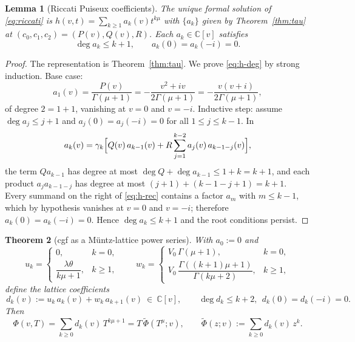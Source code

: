 \documentclass[11pt]{article}
\newtheorem{theorem}{Theorem}[section]
\newtheorem{lemma}[theorem]{Lemma}
\newcommand{\C}{\mathbb{C}}
\begin{document}
\begin{lemma}[Riccati Puiseux coefficients]\label{lem:h}
The unique formal solution of \eqref{eq:riccati} is
$h(v,t)=\sum_{k\ge1}a_k(v)t^{k\mu}$ with $\{a_k\}$ given by
Theorem~\ref{thm:tau} at $(c_0,c_1,c_2)=(P(v),Q(v),R)$. Each $a_k\in\C[v]$
satisfies
\begin{equation}\label{eq:h-deg}
\deg a_k\le k+1,\qquad a_k(0)=a_k(-i)=0 .
\end{equation}
\end{lemma}

\begin{proof}
The representation is Theorem~\ref{thm:tau}. We prove \eqref{eq:h-deg} by
strong induction. Base case:
\begin{equation}\label{eq:h-base}
a_1(v)=\frac{P(v)}{\Gamma(\mu+1)}=-\frac{v^2+iv}{2\Gamma(\mu+1)}
=-\frac{v(v+i)}{2\Gamma(\mu+1)},
\end{equation}
of degree $2=1+1$, vanishing at $v=0$ and $v=-i$. Inductive step: assume
$\deg a_j\le j+1$ and $a_j(0)=a_j(-i)=0$ for all $1\le j\le k-1$. In
\begin{equation}\label{eq:h-rec}
a_k(v)=\gamma_k\Bigl[Q(v)\,a_{k-1}(v)
+R\sum_{j=1}^{k-2}a_j(v)\,a_{k-1-j}(v)\Bigr],
\end{equation}
the term $Q a_{k-1}$ has degree at most $\deg Q+\deg a_{k-1}\le 1+k=k+1$,
and each product $a_j a_{k-1-j}$ has degree at most
$(j+1)+(k-1-j+1)=k+1$. Every summand on the right of \eqref{eq:h-rec}
contains a factor $a_m$ with $m\le k-1$, which by hypothesis vanishes at
$v=0$ and $v=-i$; therefore $a_k(0)=a_k(-i)=0$. Hence $\deg a_k\le k+1$ and
the root conditions persist.
\end{proof}

\begin{theorem}[cgf as a M\"untz-lattice power series]\label{thm:cgf}
With $a_0:=0$ and
\begin{equation}\label{eq:uw-def}
u_k=\begin{cases}0,&k=0,\\[2pt]\dfrac{\lambda\theta}{k\mu+1},&k\ge1,
\end{cases}
\qquad
w_k=\begin{cases}V_0\,\Gamma(\mu+1),&k=0,\\[4pt]
V_0\,\dfrac{\Gamma((k+1)\mu+1)}{\Gamma(k\mu+2)},&k\ge1,\end{cases}
\end{equation}
define the lattice coefficients
\begin{equation}\label{eq:dk}
\boxed{\,d_k(v):=u_k\,a_k(v)+w_k\,a_{k+1}(v)\ \in\ \C[v],\qquad
\deg d_k\le k+2,\ \ d_k(0)=d_k(-i)=0.\,}
\end{equation}
Then
\begin{equation}\label{eq:Phi-series}
\Phi(v,T)=\sum_{k\ge0}d_k(v)\,T^{k\mu+1}=T\,\widetilde\Phi(T^{\mu};v),
\qquad
\widetilde\Phi(z;v):=\sum_{k\ge0}d_k(v)\,z^{k}.
\end{equation}
\end{theorem}
\end{document}

